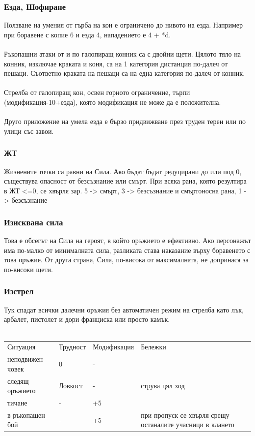 \subsubsection{Езда, Шофиране}
Ползване на умения от гърба на кон е ограничено до нивото на езда.
Например при боравене с копие 6 и езда 4, нападението е 4 + *d.
\\
\\
Ръкопашни атаки от и по галопиращ конник са с двойни щети.
Цялото тяло на конник, изключае краката и коня, са на 1 категория дистанция по-далеч от пешаци.
Съответно краката на пешаци са на една категория по-далеч от конник.
\\
\\
Стрелба от галопиращ кон, освен горното ограничение, търпи (модификация-10+езда), която модификация не може да е положителна.
\\
\\
Друго приложение на умела езда е бързо придвижване през труден терен или по улици със завои.


\subsubsection{ЖТ}
Жизнените точки са равни на Сила.
Ако бъдат бъдат редуцирани до или под 0, съществува опасност от безсъзнание или смърт.
При всяка рана, която резултира в ЖТ <=0, се хвърля зар.
5 -> смърт, 3 -> безсъзнание и смъртоносна рана, 1 -> безсъзнание


\subsubsection{Изисквана сила}
Това е обсегът на Сила на героят, в който оръжието е ефективно.
Ако персонажът има по-малко от минималната сила, разликата става наказание върху боравенето с това оръжие.
От друга страна, Сила, по-висока от максималната, не допринася за по-високи щети.


\subsubsection{Изстрел}
Тук спадат всички далечни оръжия без автоматичен режим на стрелба като лък, арбалет, пистолет и дори франциска или просто камък.
\\
\\
\begin{tabular}{l | l | l | l }
Ситуация         & Трудност & Модификация & Бележки                                                    \\
неподвижен човек & 0        & -           &                                                            \\
следящ оръжието  & Ловкост  & -           & струва цял ход                                             \\
тичане           & -        & +5          &                                                            \\
в ръкопашен бой  & -        & +5          & при пропуск се хвърля срещу останалите учасници в клането  \\
\end{tabular}


